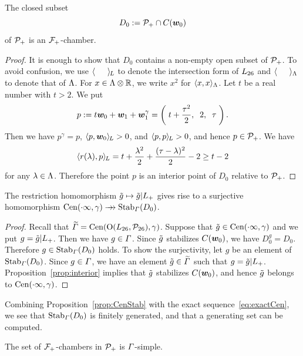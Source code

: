 \documentclass{amsart} %
\begin{document}
%
%
\begin{proposition}\label{prop:D0}
The closed subset 
\[
D_0:=\mathord{\mathcal{P}}_{+}\cap \mathord{C}(\boldsymbol{w}_0)
\]
of $\mathord{\mathcal{P}}_{+}$ is an $\mathord{\mathcal{F}}_{+}$-chamber.
\end{proposition}
%
\begin{proof}
It is enough to show that $D_0$ contains a non-empty open subset of $\mathord{\mathcal{P}}_{+}$.
To avoid confusion, we use $\langle \phantom{a, a} \rangle_{\hskip -1pt L}$ to denote the intersection form of $L_{26}$
and $\langle \phantom{a, a} \rangle_{\Lambda}$ to denote that of $\Lambda$.
For $x\in \Lambda\otimes\mathord{\mathbb{R}}$, we write $x^2$ for $\langle x,x \rangle_{\Lambda}$.
Let $t$ be a real number with $t>2$.
We put
\[
p:=t\boldsymbol{w}_0+\boldsymbol{w}_1+\boldsymbol{w}_1^{\gamma}=\left(\; t+\frac{\tau^2}{2}, \;\;2, \;\; \tau\;\right).
\]
%
Then we have $p^{\gamma}=p$, $\langle p, \boldsymbol{w}_0 \rangle_{\hskip -1pt L}>0$, and $\langle p, p \rangle_{\hskip -1pt L}>0$,
and hence $p\in \mathord{\mathcal{P}}_{+}$.
We have 
\[
\langle r(\lambda), p \rangle_{\hskip -1pt L}=t+\frac{\lambda^2}{2}+\frac{(\tau-\lambda)^2}{2}-2\ge t-2
\]
for any $\lambda\in \Lambda$.
Therefore the point $p$ is an interior point of $D_0$ relative to $\mathord{\mathcal{P}}_{+}$.
\end{proof}
%
\begin{proposition}\label{prop:CenStab}
The restriction homomorphism
$\tilde{g}\mapsto \tilde{g}|L_{+}$
gives rise to a surjective homomorphism 
$\mathrm{Cen}(\cdot \infty, \gamma)\mathrel{\rightarrow\!\!\!\!\rightarrow} \operatorname{Stab}_{\varGamma}(D_0)$.
\end{proposition}
%
\begin{proof}
Recall that 
$\widetilde{\varGamma}=\mathrm{Cen}(\mathord{\mathrm{O}}(L_{26}, \mathord{\mathcal{P}}_{26}), \gamma)$.
Suppose that $\tilde{g}\in \mathrm{Cen}(\cdot \infty, \gamma)$
and we put $g=\tilde{g}|L_{+}$.
Then we have $g\in \varGamma$.
Since $\tilde{g}$ stabilizes $\mathord{C}(\boldsymbol{w}_0)$,
we have $D_0^g=D_0$.
Therefore $ g\in \operatorname{Stab}_{\varGamma}(D_0)$ holds.
To show the surjectivity,
let $g$ be an element of $\operatorname{Stab}_{\varGamma}(D_0)$.
Since $g\in \varGamma$,
we have an element $\tilde{g}\in \widetilde{\varGamma}$ such that $g=\tilde{g}|L_{+}$.
Proposition~\ref{prop:interior} implies that $\tilde{g}$ stabilizes $\mathord{C}(\boldsymbol{w}_0)$,
and hence $\tilde{g}$ belongs to $\mathrm{Cen}(\cdot \infty, \gamma)$.
\end{proof}
%
%
Combining Proposition~\ref{prop:CenStab} with the exact sequence~\eqref{eq:exactCen}, we see that 
$\operatorname{Stab}_{\varGamma}(D_0)$ is finitely generated,
and that a generating set can be computed.
%
\begin{proposition}\label{prop:PhiSimple}
The set of $\mathord{\mathcal{F}}_{+}$-chambers in $\mathord{\mathcal{P}}_{+}$ is $\varGamma$-simple.
\end{proposition}
%
\end{document}
